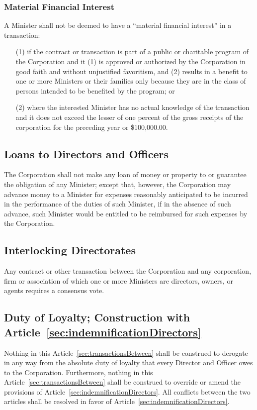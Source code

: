 \documentclass[letterpaper,titlepage]{article}
\begin{document}
\subsubsection{Material Financial Interest}
\label{sec:materialFinancial}
A Minister shall not be deemed to have a ``material financial interest'' in a
transaction:
\begin{itemize}
    \item[(1)] if the contract or transaction is part of a public or charitable
        program of the Corporation and it (1) is approved or authorized by the
        Corporation in good faith and without unjustified favoritism, and (2)
        results in a benefit to one or more Ministers or their families only
        because they are in the class of persons intended to be benefited by
        the program; or
    \item[(2)] where the interested Minister has no actual knowledge of the
        transaction and it does not exceed the lesser of one percent of the
        gross receipts of the corporation for the preceding year or
        \$100,000.00.
\end{itemize}
\subsection{Loans to Directors and Officers}
\label{sec:loansDirectors}
The Corporation shall not make any loan of money or property to or guarantee
the obligation of any Minister; except that, however, the Corporation may
advance money to a Minister for expenses reasonably anticipated to be incurred
in the performance of the duties of such Minister, if in the absence of such
advance, such Minister would be entitled to be reimbursed for such expenses by
the Corporation.
\subsection{Interlocking Directorates}
\label{sec:interlockingDirectorates}
Any contract or other transaction between the Corporation and any corporation,
firm or association of which one or more Ministers are directors, owners, or
agents requires a consensus vote.
\subsection{Duty of Loyalty; Construction with
Article~\ref{sec:indemnificationDirectors}}
\label{sec:dutyLoyalty}
Nothing in this Article~\ref{sec:transactionsBetween} shall be construed to
derogate in any way from the absolute duty of loyalty that every Director and
Officer owes to the Corporation. Furthermore, nothing in this
Article~\ref{sec:transactionsBetween} shall be construed to override or amend
the provisions of Article~\ref{sec:indemnificationDirectors}. All conflicts between the
two articles shall be resolved in favor of
Article~\ref{sec:indemnificationDirectors}.
\end{document}
